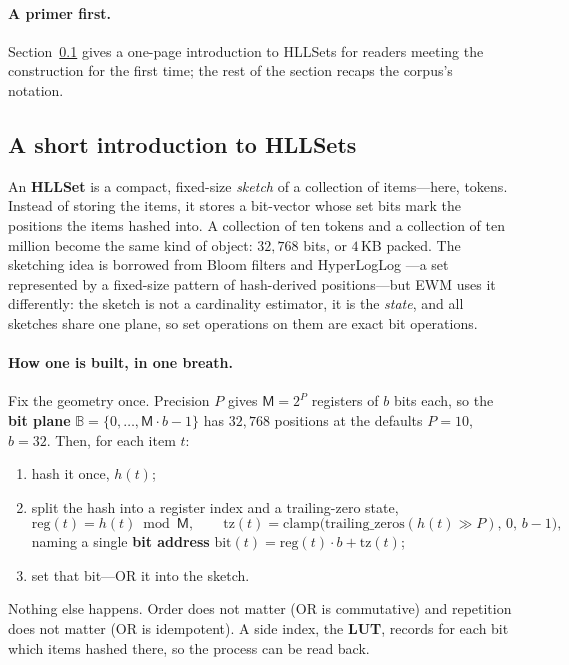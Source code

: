 \documentclass[11pt,a4paper]{article}
\theoremstyle{remark}
\newcommand{\Plane}{\ensuremath{\mathbb{B}}}          %
\newcommand{\Reg}{\ensuremath{\mathsf{M}}}             %
\newcommand{\Prec}{\ensuremath{P}}                     %
\newcommand{\Bits}{\ensuremath{b}}                     %
\begin{document}
\paragraph{A primer first.} Section~\ref{sec:primer} gives a one-page
introduction to HLLSets for readers meeting the construction for the first
time; the rest of the section recaps the corpus's notation.

\subsection{A short introduction to HLLSets}
\label{sec:primer}

An \textbf{HLLSet} is a compact, fixed-size \emph{sketch} of a collection of
items---here, tokens. Instead of storing the items, it stores a bit-vector whose
set bits mark the positions the items hashed into. A collection of ten tokens
and a collection of ten million become the same kind of object: $32{,}768$ bits,
or $4$\,KB packed. The sketching idea is borrowed from Bloom filters and
HyperLogLog \cite{bloom1970,flajolet2007}---a set represented by a fixed-size
pattern of hash-derived positions---but EWM uses it differently: the sketch is
not a cardinality estimator, it is the \emph{state}, and all sketches share one
plane, so set operations on them are exact bit operations.

\paragraph{How one is built, in one breath.} Fix the geometry once. Precision
$\Prec$ gives $\Reg=2^{\Prec}$ registers of $\Bits$ bits each, so the
\textbf{bit plane} $\Plane=\{0,\dots,\Reg\cdot\Bits-1\}$ has $32{,}768$
positions at the defaults $\Prec=10$, $\Bits=32$. Then, for each item $t$:
\begin{enumerate}[leftmargin=*,nosep]
  \item hash it once, $h(t)$;
  \item split the hash into a register index and a trailing-zero state,
    \begin{equation}
    \label{eq:position}
    \mathrm{reg}(t)=h(t)\bmod \Reg,\qquad
    \mathrm{tz}(t)=\mathrm{clamp}\bigl(\mathrm{trailing\_zeros}(h(t)\gg\Prec),\,0,\,\Bits-1\bigr),
    \end{equation}
    naming a single \textbf{bit address}
    $\mathrm{bit}(t)=\mathrm{reg}(t)\cdot\Bits+\mathrm{tz}(t)$;
  \item set that bit---OR it into the sketch.
\end{enumerate}
Nothing else happens. Order does not matter (OR is commutative) and repetition
does not matter (OR is idempotent). A side index, the \textbf{LUT}, records for
each bit which items hashed there, so the process can be read back.
\end{document}
